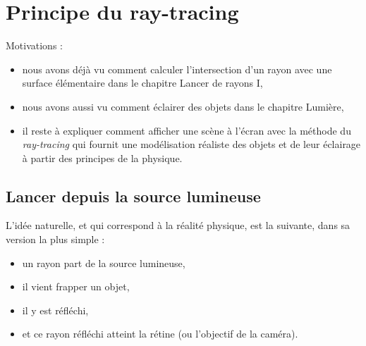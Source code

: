\documentclass[11pt,class=report,crop=false]{standalone}
\begin{document}


\section{Principe du ray-tracing}

Motivations :
\begin{itemize}
	\item nous avons déjà vu comment calculer l'intersection d'un rayon avec une surface élémentaire dans le chapitre \og{}Lancer de rayons I\fg{},
	
	\item nous avons aussi vu comment éclairer des objets dans le chapitre \og{}Lumière\fg{},
	
	\item il reste à expliquer comment afficher une scène à l'écran avec la méthode du \emph{ray-tracing} qui fournit une modélisation réaliste des objets et de leur éclairage à partir des principes de la physique.
	
\end{itemize}


\subsection{Lancer depuis la source lumineuse}

L'idée naturelle, et qui correspond à la réalité physique, est la suivante, dans sa version la plus simple :
\begin{itemize}
	\item un rayon part de la source lumineuse,
	\item il vient frapper un objet,
	\item il y est réfléchi,
	\item et ce rayon réfléchi atteint la rétine (ou l'objectif de la caméra).
\end{itemize}


\end{document}
